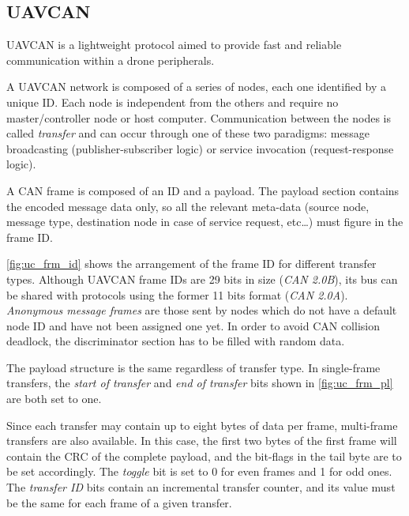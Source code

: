 \subsection{UAVCAN}\label{subsec:uavcan}
UAVCAN is a lightweight protocol aimed to provide fast and reliable communication within a drone peripherals.

A UAVCAN network is composed of a series of nodes, each one identified by a unique ID.
Each node is independent from the others and require no master/controller node or host computer.
Communication between the nodes is called \emph{transfer} and can occur through one of these two paradigms: message broadcasting (publisher-subscriber logic) or service invocation (request-response logic).

A CAN frame is composed of an ID and a payload.
The payload section contains the encoded message data only, so all the relevant meta-data (source node, message type, destination node in case of service request, etc\dots) must figure in the frame ID.


\autoref{fig:uc_frm_id} shows the arrangement of the frame ID for different transfer types.
Although UAVCAN frame IDs are 29 bits in size (\emph{CAN 2.0B}), its bus can be shared with protocols using the former 11 bits format (\emph{CAN 2.0A}).
\emph{Anonymous message frames} are those sent by nodes which do not have a default node ID and have not been assigned one yet.
In order to avoid CAN collision deadlock, the discriminator section has to be filled with random data.


The payload structure is the same regardless of transfer type.
In single-frame transfers, the \emph{start of transfer} and \emph{end of transfer} bits shown in \autoref{fig:uc_frm_pl} are both set to one.

Since each transfer may contain up to eight bytes of data per frame, multi-frame transfers are also available.
In this case, the first two bytes of the first frame will contain the CRC of the complete payload, and the bit-flags in the tail byte are to be set accordingly.
The \emph{toggle} bit is set to 0 for even frames and 1 for odd ones.
The \emph{transfer ID} bits contain an incremental transfer counter, and its value must be the same for each frame of a given transfer.

